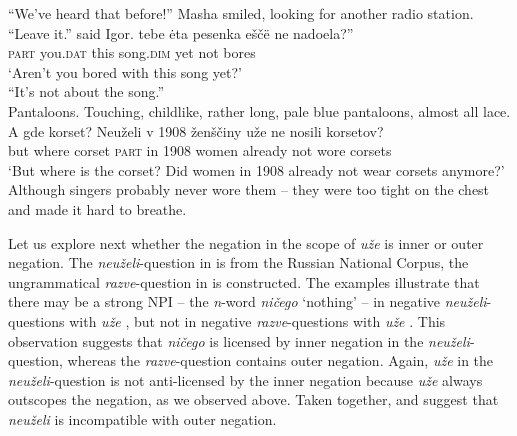 \documentclass[output=paper,colorlinks,citecolor=brown]{langscibook}
\begin{document}
\ea\label{ex:05:8}
``We've heard that before!'' Masha smiled, looking for another radio station. ``Leave it.'' said Igor.
\sn  {} {tebe} ėta pesenka eščë ne {nadoela?''}\\
{\textsc{part}} {you.\textsc{dat}} this song.\textsc{dim} yet not {bores} \\
 \glt `Aren't you bored with this song yet?' \\
``It's not about the song.''\\
\ex\label{ex:05:9}
Pantaloons. Touching, childlike, rather long, pale blue pantaloons, almost all lace.
\sn \gll A gde {korset?} {Neuželi} v 1908 ženščiny uže ne nosili {korsetov?}\\
but where {corset} {\textsc{part}} in 1908 women already not wore {corsets}\\
\glt `But where is the corset? Did women in 1908 already not wear corsets anymore?'\\
Although singers probably never wore them – they were too tight on the chest and made it hard to breathe. \\
\z

Let us explore next whether the negation in the scope of \textit{uže} is inner or outer negation. The \textit{neuželi}-question in  is from the Russian National Corpus, the ungrammatical \textit{razve}-question in  is constructed. The examples illustrate that there may be a strong NPI – the \textit{n}-word \textit{ničego} `nothing' – in negative \textit{neuželi}-questions with \textit{uže} , but not in negative \textit{razve}-questions with \textit{uže} . This observation suggests that \textit{ničego} is licensed by inner negation in the \textit{neuželi}-question, whereas the \textit{razve}-question contains outer negation. Again, \textit{uže} in the \textit{neuželi}-question is not anti-licensed by the inner negation because \textit{uže} always outscopes the negation, as we observed above. Taken together,  and  suggest that \textit{neuželi} is incompatible with outer negation.

\label{ex:05:11}
\z
\end{document}
